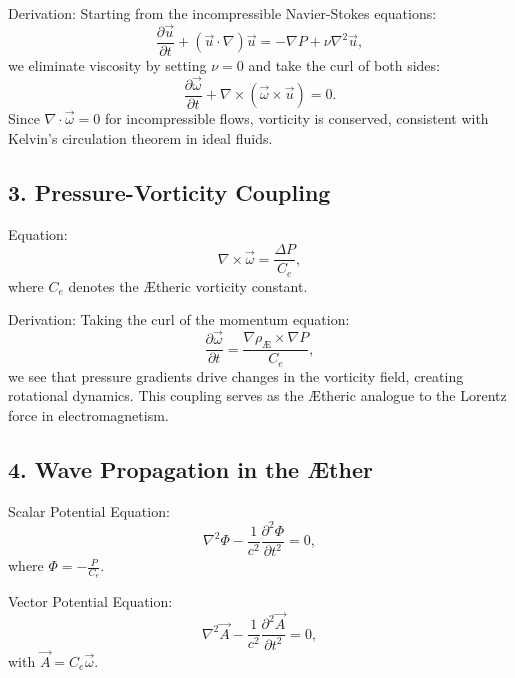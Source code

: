         Derivation:
        Starting from the incompressible Navier-Stokes equations:
        \begin{equation*}
            \frac{\partial \vec{u}}{\partial t} + (\vec{u} \cdot \nabla) \vec{u} = -\nabla P + \nu \nabla^2 \vec{u},
        \end{equation*}
        we eliminate viscosity by setting $\nu = 0$ and take the curl of both sides:
        \begin{equation*}
            \frac{\partial \vec{\omega}}{\partial t} + \nabla \times (\vec{\omega} \times \vec{u}) = 0.
        \end{equation*}
        Since $\nabla \cdot \vec{\omega} = 0$ for incompressible flows, vorticity is conserved, consistent with Kelvin's circulation theorem in ideal fluids.

        \subsection*{3. Pressure-Vorticity Coupling}
        Equation:
        \begin{equation*}
            \nabla \times \vec{\omega} = \frac{\Delta P}{C_e},
        \end{equation*}
        where $C_e$ denotes the Ætheric vorticity constant.

        Derivation:
        Taking the curl of the momentum equation:
        \begin{equation*}
            \frac{\partial \vec{\omega}}{\partial t} = \frac{\nabla \rho_\text{Æ} \times \nabla P}{C_e},
        \end{equation*}
        we see that pressure gradients drive changes in the vorticity field, creating rotational dynamics. This coupling serves as the Ætheric analogue to the Lorentz force in electromagnetism.

        \subsection*{4. Wave Propagation in the Æther}
        Scalar Potential Equation:
        \begin{equation*}
            \nabla^2 \Phi - \frac{1}{c^2} \frac{\partial^2 \Phi}{\partial t^2} = 0,
        \end{equation*}
        where $\Phi = -\frac{P}{C_e}$.

        Vector Potential Equation:
        \begin{equation*}
            \nabla^2 \vec{A} - \frac{1}{c^2} \frac{\partial^2 \vec{A}}{\partial t^2} = 0,
        \end{equation*}
        with $\vec{A} = C_e \vec{\omega}$.

